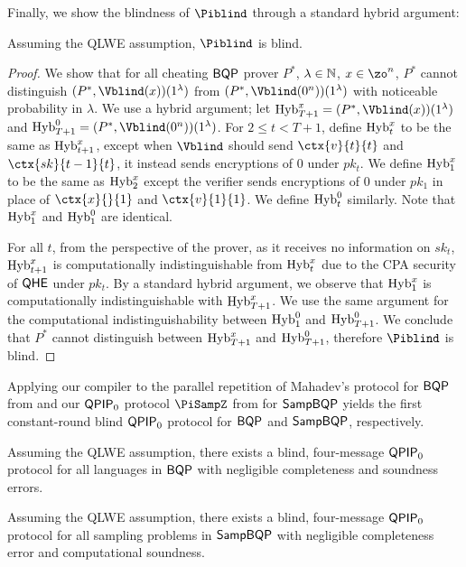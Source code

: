 Finally, we show the blindness of $\Piblind$ through a standard hybrid argument:
\begin{thm} \label{thm:compiler-blindness}
    Assuming the QLWE assumption, $\Piblind$ is blind.
\end{thm}
\begin{proof}
    We show that for all cheating $\operatorname{\mathsf{BQP}}$ prover $P^*$, $\lambda\in\mathbb{N}$, $x\in\zo^n$,
    $P^*$ cannot distinguish $(P^*, \Vblind(x))(1^\lambda)$ from $(P^*, \Vblind(0^n))(1^\lambda)$ with noticeable probability in $\lambda$.
    We use a hybrid argument; let $\Hyb_{T+1}^x=(P^*, \Vblind(x))(1^\lambda)$ and $\Hyb_{T+1}^0=(P^*, \Vblind(0^n))(1^\lambda)$.
    For $2\leq t<T+1$, define $\operatorname{Hyb}_t^x$ to be the same as $\operatorname{Hyb}_{t+1}^x$,
    except when $\Vblind$ should send $\ctx{v}{t}{t}$ and $\ctx{sk}{t-1}{t}$, it instead sends encryptions of $0$ under $pk_t$.
    We define $\operatorname{Hyb}_1^x$ to be the same as $\operatorname{Hyb}_2^x$ except the verifier sends encryptions of $0$ under $pk_1$ in place of $\ctx{x}{}{1}$ and $\ctx{v}{1}{1}$.
    We define $\operatorname{Hyb}_t^0$ similarly. Note that $\operatorname{Hyb}_1^x$ and $\operatorname{Hyb}_1^0$ are identical.

    For all $t$, from the perspective of the prover,
    as it receives no information on $sk_t$,
    $\operatorname{Hyb}_{t+1}^x$ is computationally indistinguishable from $\operatorname{Hyb}_t^x$ due to the CPA security of $\mathsf{QHE}$ under $pk_t$.
    By a standard hybrid argument, we observe that $\operatorname{Hyb}_1^x$ is computationally indistinguishable with $\operatorname{Hyb}_{T+1}^x$.
    We use the same argument for the computational indistinguishability between $\operatorname{Hyb}_1^0$ and $\operatorname{Hyb}_{T+1}^0$.
    We conclude that $P^*$ cannot distinguish between $\operatorname{Hyb}_{T+1}^x$ and $\operatorname{Hyb}_{T+1}^0$,
    therefore $\Piblind$ is blind.
\end{proof}

Applying our compiler to the parallel repetition of Mahadev's protocol for $\operatorname{\mathsf{BQP}}$ from \cite{arXiv:ChiaChungYam19, arXiv:AlaChiHun19} and our $\operatorname{\mathsf{QPIP}}_0$ protocol $\PiSampZ$ from  for $\operatorname{\mathsf{SampBQP}}$ yields the first constant-round blind $\operatorname{\mathsf{QPIP}}_0$ protocol for $\operatorname{\mathsf{BQP}}$ and $\operatorname{\mathsf{SampBQP}}$, respectively.

\begin{thm}
    Assuming the QLWE assumption,  there exists a blind, four-message $\operatorname{\mathsf{QPIP}}_0$ protocol for all languages in $\operatorname{\mathsf{BQP}}$ with negligible completeness and soundness errors.
\end{thm}

\begin{thm}
        Assuming the QLWE assumption, there exists a blind, four-message $\operatorname{\mathsf{QPIP}}_0$ protocol for all sampling problems in $\operatorname{\mathsf{SampBQP}}$ with negligible completeness error and computational soundness.
\end{thm}


